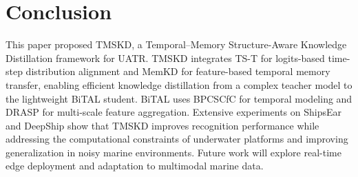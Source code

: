 ﻿\documentclass[lettersize,journal]{IEEEtran}
\begin{document}
\section{Conclusion}

This paper proposed TMSKD, a Temporal--Memory Structure-Aware Knowledge Distillation framework for UATR. TMSKD integrates TS-T for logits-based time-step distribution alignment and MemKD for feature-based temporal memory transfer, enabling efficient knowledge distillation from a complex teacher model to the lightweight BiTAL student. BiTAL uses BPCSCfC for temporal modeling and DRASP for multi-scale feature aggregation. Extensive experiments on ShipsEar and DeepShip show that TMSKD improves recognition performance while addressing the computational constraints of underwater platforms and improving generalization in noisy marine environments. Future work will explore real-time edge deployment and adaptation to multimodal marine data.

\newpage


\end{document}
